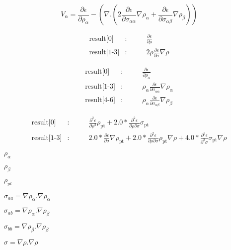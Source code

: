 \documentclass{article}
\begin{document}
\[
   V_{\alpha} =  \frac{\partial \epsilon}{\partial \rho_{\alpha}}
                 - \left(\nabla . \left(2 \frac{\partial \epsilon}{\partial \sigma_{\alpha \alpha}} \nabla \rho_{\alpha}
                 + \frac{\partial \epsilon}{\partial \sigma_{\alpha \beta}} \nabla \rho_{\beta}  \right)  \right)
\]
\pagebreak

\begin{eqnarray*}
    \mbox{result[0]}    &:& \qquad \frac{\partial \epsilon}{\partial \rho} \\
    \mbox{result[1-3]}  &:& \qquad 2 \rho \frac{\partial \epsilon}{\partial \sigma} \nabla\rho
\end{eqnarray*}
\pagebreak

\begin{eqnarray*}
    \mbox{result[0]}    &:& \qquad \frac{\partial \epsilon}{\partial \rho_{\alpha}} \\
    \mbox{result[1-3]}  &:& \qquad \rho_\alpha \frac{\partial \epsilon}{\partial \sigma_{\alpha \alpha}} \nabla\rho_\alpha\\
    \mbox{result[4-6]}  &:& \qquad \rho_\alpha \frac{\partial \epsilon}{\partial \sigma_{\alpha \beta}} \nabla\rho_\beta
\end{eqnarray*}
\pagebreak

\begin{eqnarray*}
    \mbox{result[0]}    &:& \qquad \frac{\partial^2 \epsilon}{\partial \rho^2} \rho_\mathrm{pt}
                            + 2.0 * \frac{\partial^2 \epsilon}{\partial \rho\partial\sigma}\sigma_\mathrm{pt}\\
    \mbox{result[1-3]}  &:& \qquad 2.0 * \frac{\partial\epsilon}{\partial\sigma}\nabla\rho_\mathrm{pt}
                            + 2.0 * \frac{\partial^2\epsilon}{\partial\rho\partial\sigma} \rho_\mathrm{pt}\nabla\rho
                            + 4.0 * \frac{\partial^2\epsilon}{\partial^2\sigma} \sigma_\mathrm{pt}\nabla\rho
\end{eqnarray*}
\pagebreak

$ \rho_\alpha $
\pagebreak

$ \rho_\beta $
\pagebreak

$ \rho_{pt} $
\pagebreak

$ \sigma_{aa} = \nabla \rho_{\alpha}.\nabla \rho_{\alpha} $
\pagebreak

$ \sigma_{ab} = \nabla \rho_{\alpha}.\nabla \rho_{\beta} $
\pagebreak

$ \sigma_{bb} = \nabla \rho_{\beta}.\nabla \rho_{\beta} $
\pagebreak

$ \sigma = \nabla \rho.\nabla \rho $
\pagebreak
\end{document}
